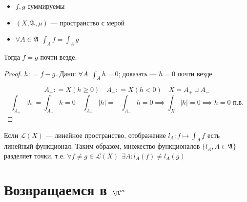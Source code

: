 \begin{lemma}\itemfix
    \begin{itemize}
        \item \(f, g\) суммируемы
        \item \((X, \mathfrak{A}, \mu)\) --- пространство с мерой
        \item \(\forall A\in \mathfrak{A} \ \ \int_A f = \int_A g\)
    \end{itemize}

    Тогда \(f = g\) почти везде.
\end{lemma}

\begin{proof}
    \(h: = f - g\). Дано: \(\forall A \ \ \int_A h = 0\); доказать --- \(h = 0\) почти везде.

    \[A_{ +} : = X(h \geq 0) \quad A_{ - } : = X(h < 0) \quad X = A_{ +} \sqcup A_{ -}\]
    \[\int_{A_{ +}} |h| = \int_{A_{ +}} h = 0 \quad \int_{A_{ -}} |h| = -\int_{A_{ -}} h = 0 \implies \int_X |h| = 0 \implies h = 0 \text{ п.в.}\]
\end{proof}

\begin{remark}
    Если \(\mathcal{L}(X)\) --- линейное пространство, отображение \(l_A : f \mapsto \int_A f\) есть линейный функционал. Таким образом, множество функционалов \(\{l_A, A \in \mathfrak{A}\}\) разделяет точки, т.е. \(\forall f \neq g \in \mathcal{L}(X) \ \ \exists A : l_A(f) \neq l_A(g)\)
\end{remark}


\section{Возвращаемся в \(\R^m\)}

